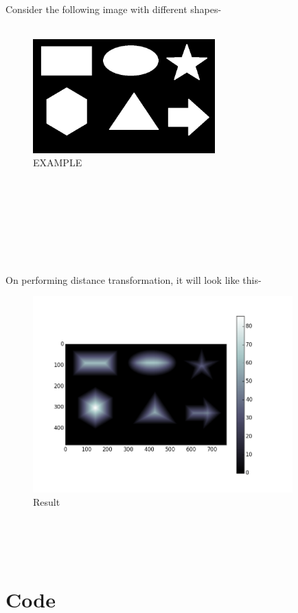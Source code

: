 \documentclass[]{article}
\begin{document}
Consider the following image with different shapes- \\ \\

\begin{figure}[htbp]
\begin{center}
\includegraphics[width = 7cm]{images/Distance Transform/Images/example.jpg}
\caption{EXAMPLE}
\end{center}
\end{figure}
~\\ \\ \\ \\ \\ \\ \\
On performing distance transformation, it will look like this-

\begin{figure}[htbp]
\begin{center}
\includegraphics[width = 10cm]{images/Distance Transform/Images/Result.png}
\caption{Result}
\end{center}
\end{figure}
~\\ \\ \\
\section{Code}\label{code}
\end{document}
